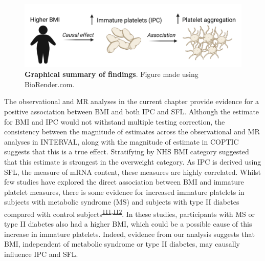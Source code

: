 \documentclass[11pt,twoside]{bristolthesis}
\begin{document}
\begin{figure}
\includegraphics[width=0.9\linewidth]{figure/BMI_platelets/Visual_abstract} \caption[Graphical summary of findings]{\textbf{Graphical summary of findings}. Figure made using BioRender.com.}\label{fig:BMI-platelet-cartoon}
\end{figure}
The observational and MR analyses in the current chapter provide evidence for a positive association between BMI and both IPC and SFL. Although the estimate for BMI and IPC would not withstand multiple testing correction, the consistency between the magnitude of estimates across the observational and MR analyses in INTERVAL, along with the magnitude of estimate in COPTIC suggests that this is a true effect. Stratifying by NHS BMI category suggested that this estimate is strongest in the overweight category. As IPC is derived using SFL, the measure of mRNA content, these measures are highly correlated. Whilst few studies have explored the direct association between BMI and immature platelet measures, there is some evidence for increased immature platelets in subjects with metabolic syndrome (MS) and subjects with type II diabetes compared with control subjects\textsuperscript{\protect\hyperlink{ref-Vaduganathan2008a}{111},\protect\hyperlink{ref-Mijovic2015a}{112}}. In these studies, participants with MS or type II diabetes also had a higher BMI, which could be a possible cause of this increase in immature platelets. Indeed, evidence from our analysis suggests that BMI, independent of metabolic syndrome or type II diabetes, may causally influence IPC and SFL.
\end{document}
